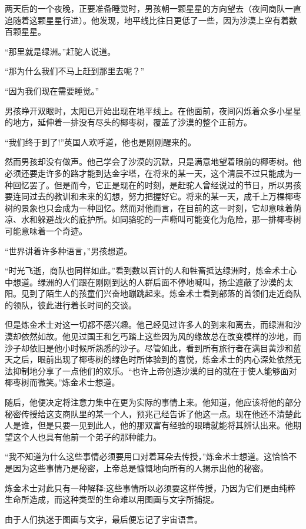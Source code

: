 \documentclass[twoside,openany]{book}
\begin{document}
两天后的一个夜晚，正要准备睡觉时，男孩朝一颗星星的方向望去（夜间商队一直追随着这颗星星行进）。他发现，地平线比往日更低了一些，因为沙漠上空有着数百颗星星。

“那里就是绿洲。”赶驼人说道。

“那为什么我们不马上赶到那里去呢？”

“因为我们现在需要睡觉。”

男孩睁开双眼时，太阳已开始出现在地平线上。在他面前，夜间闪烁着众多小星星的地方，延伸着一排没有尽头的椰枣树，覆盖了沙漠的整个正前方。

“我们终于到了!”英国人欢呼道，他也是刚刚醒来的。

然而男孩却没有做声。他己学会了沙漠的沉默，只是满意地望着眼前的椰枣树。他必须还要走许多的路才能到达金字塔，在将来的某一天，这个清晨不过只能成为一种回忆罢了。但是而今，它正是现在的时刻，是赶驼人曾经说过的节日，所以男孩要连同过去的教训和未来的幻想，努力把握好它。将来的某一天，成千上万棵椰枣树的景象也只会成为一种回忆。然而对他而言，在目前的这一时刻，它却意味着荫凉、水和躲避战火的庇护所。如同骆驼的一声嘶叫可能变化为危险，那一排椰枣树可能意味着一个奇迹。

“世界讲着许多种语言，”男孩想道。

“时光飞逝，商队也同样如此。”看到数以百计的人和牲畜抵达绿洲时，炼金术士心中想道。绿洲的人们跟在刚刚到达的人群后面不停地喊叫，扬尘遮蔽了沙漠的太阳。见到了陌生人的孩童们兴奋地蹦跳起来。炼金术士看到部落的首领们走近商队的领队，彼此进行着长时间的交谈。

但是炼金术士对这一切都不感兴趣。他己经见过许多人的到来和离去，而绿洲和沙漠却依然如故。他见过国王和乞丐踏上这些因为风的缘故总在改变模样的沙地，而沙子却依旧是他小时候所熟悉的沙子。尽管如此，看到所有旅行者在满目黄沙和蓝天之后，眼前出现了椰枣树的绿色时所体验到的喜悦，炼金术士的内心深处依然无法抑制地分享了一点他们的欢乐。“也许上帝创造沙漠的目的就在于使人能够面对椰枣树而微笑。”炼金术士想道。

随后，他便决定将注意力集中在更为实际的事情上来。他知道，他应该将他的部分秘密传授给这支商队里的某一个人，预兆己经告诉了他这一点。现在他还不清楚此人是谁，但是只要一见到此人，他的那双富有经验的眼睛就能将其辨认出来。他期望这个人也具有他前一个弟子的那种能力。

“我不知道为什么这些事情必须要用口对着耳朵去传授，”炼金术士想道。这恰恰不是因为这些事情乃是秘密，上帝总是慷慨地向所有的人揭示出他的秘密。

炼金术士对此只有一种解释:这些事情所以必须要这样传授，乃因为它们是由纯粹生命所造成，而这种类型的生命难以用图画与文字所捕捉。

由于人们执迷于图画与文字，最后便忘记了宇宙语言。
\end{document}
